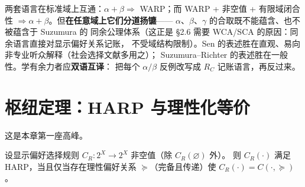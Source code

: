 \begin{remark}
两套语言在标准域上互通：$\alpha+\beta\Rightarrow$ WARP；而 WARP + 非空值 +
有限域闭合性 $\Rightarrow \alpha+\beta$。但\textbf{在任意域上它们分道扬镳}——
$\alpha$、$\beta$、$\gamma$ 的合取既不能蕴含、也不被蕴含于 Suzumura 的
同余公理体系（这正是 §2.6 需要 WCA/SCA 的原因：同余语言直接对显示偏好关系记账，
不受域结构限制）。Sen 的表述胜在直观、易向非专业听众解释（社会选择文献多用之）；
Suzumura--Richter 的表述胜在一般性。学有余力者应\textbf{双语互译}：
把每个 $\alpha/\beta$ 反例改写成 $R_C$ 记账语言，再反过来。
\end{remark}

\section{枢纽定理：HARP 与理性化等价}

这是本章第一座高峰。

\begin{theorem}\label{thm:harp}
设显示偏好选择规则 $C_R: 2^X\to 2^X$ 非空值（除 $C_R(\varnothing)$ 外）。
则 $C_R(\cdot)$ 满足 HARP，当且仅当存在理性偏好关系 $\succeq$（完备且传递）使
$C_R(\cdot)=C(\cdot,\succeq)$。
\end{theorem}

